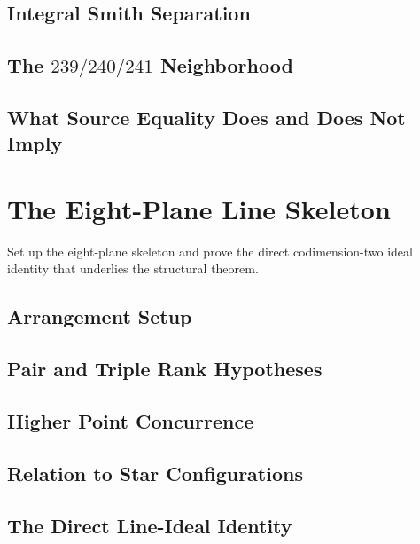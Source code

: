 \subsection{Integral Smith Separation}

\subsection{The \(239/240/241\) Neighborhood}

\subsection{What Source Equality Does and Does Not Imply}

\section{The Eight-Plane Line Skeleton}\label{sec:line-skeleton}


Set up the eight-plane skeleton and prove the direct codimension-two ideal
identity that underlies the structural theorem.

\subsection{Arrangement Setup}

\subsection{Pair and Triple Rank Hypotheses}

\subsection{Higher Point Concurrence}

\subsection{Relation to Star Configurations}

\subsection{The Direct Line-Ideal Identity}

